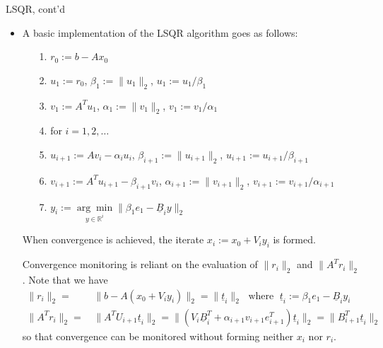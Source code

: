 \documentclass[t,usepdftitle=false]{beamer}
\begin{document}
\begin{frame}{LSQR, cont'd}
\begin{itemize}
\item A basic implementation of the LSQR algorithm goes as follows:
\begin{itemize}
\item[1.]$r_0:=b-Ax_0$\vspace{.1cm}
\item[2.]$u_1:=r_0$, $\beta_1:=\|u_1\|_2$, $u_1:=u_1/\beta_1$\vspace{.1cm}
\item[3.]$v_1:=A^Tu_1$, $\alpha_1:=\|v_1\|_2$, $v_1:=v_1/\alpha_1$\vspace{.1cm}
\item[4.]for $i=1,2,\dots$\vspace{.1cm}
\item[5.]\hspace{.2cm}$u_{i+1}:=Av_i-\alpha_iu_i$, $\beta_{i+1}:=\|u_{i+1}\|_2$, $u_{i+1}:=u_{i+1}/\beta_{i+1}$\vspace{.1cm}
\item[6.]\hspace{.2cm}$v_{i+1}:=A^Tu_{i+1}-\beta_{i+1}v_i$, $\alpha_{i+1}:=\|v_{i+1}\|_2$, $v_{i+1}:=v_{i+1}/\alpha_{i+1}$\vspace{.1cm}
\item[7.]\hspace{.2cm}$y_i:=\underset{y\in\mathbb{R}^i}{\arg\min}\|\beta_1e_1-\underline{B}_iy\|_2$\vspace{.1cm}
\end{itemize}
When convergence is achieved, the iterate $x_i:=x_0+V_iy_i$ is formed.
\item[]Convergence monitoring is reliant on the evaluation of $\|r_i\|_2$ and $\|A^Tr_i\|_2$.
Note that we have\vspace{-.1cm}
\begin{align*}
\|r_i\|_2
=&\,
\|b-A(x_0+V_iy_i)\|_2
=\|\underline{t}_i\|_2
\;\text{ where }\;
\underline{t}_i:=\beta_1e_1-\underline{B}_iy_i\\
\|A^Tr_i\|_2=&\,
\|A^TU_{i+1}\underline{t}_i\|_2
=\|(V_{i}\underline{B}_i^T+\alpha_{i+1}v_{i+1}e_{i+1}^T)\underline{t}_i\|_2=
\|B_{i+1}^T\underline{t}_i\|_2
\end{align*}
so that convergence can be monitored without forming neither $x_i$ nor $r_i$.
\end{itemize}
\end{frame}
\end{document}
